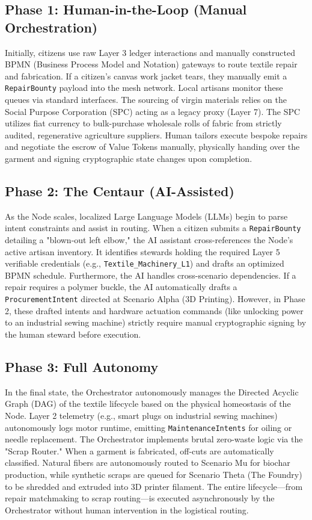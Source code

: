 \subsection{Phase 1: Human-in-the-Loop (Manual Orchestration)}
Initially, citizens use raw Layer 3 ledger interactions and manually constructed BPMN (Business Process Model and Notation) gateways to route textile repair and fabrication. If a citizen's canvas work jacket tears, they manually emit a \texttt{RepairBounty} payload into the mesh network. Local artisans monitor these queues via standard interfaces. 
The sourcing of virgin materials relies on the Social Purpose Corporation (SPC) acting as a legacy proxy (Layer 7). The SPC utilizes fiat currency to bulk-purchase wholesale rolls of fabric from strictly audited, regenerative agriculture suppliers. Human tailors execute bespoke repairs and negotiate the escrow of Value Tokens manually, physically handing over the garment and signing cryptographic state changes upon completion.

\subsection{Phase 2: The Centaur (AI-Assisted)}
As the Node scales, localized Large Language Models (LLMs) begin to parse intent constraints and assist in routing. When a citizen submits a \texttt{RepairBounty} detailing a "blown-out left elbow," the AI assistant cross-references the Node's active artisan inventory. It identifies stewards holding the required Layer 5 verifiable credentials (e.g., \texttt{Textile\_Machinery\_L1}) and drafts an optimized BPMN schedule.
Furthermore, the AI handles cross-scenario dependencies. If a repair requires a polymer buckle, the AI automatically drafts a \texttt{ProcurementIntent} directed at Scenario Alpha (3D Printing). However, in Phase 2, these drafted intents and hardware actuation commands (like unlocking power to an industrial sewing machine) strictly require manual cryptographic signing by the human steward before execution.

\subsection{Phase 3: Full Autonomy}
In the final state, the Orchestrator autonomously manages the Directed Acyclic Graph (DAG) of the textile lifecycle based on the physical homeostasis of the Node. Layer 2 telemetry (e.g., smart plugs on industrial sewing machines) autonomously logs motor runtime, emitting \texttt{MaintenanceIntents} for oiling or needle replacement. 
The Orchestrator implements brutal zero-waste logic via the "Scrap Router." When a garment is fabricated, off-cuts are automatically classified. Natural fibers are autonomously routed to Scenario Mu for biochar production, while synthetic scraps are queued for Scenario Theta (The Foundry) to be shredded and extruded into 3D printer filament. The entire lifecycle---from repair matchmaking to scrap routing---is executed asynchronously by the Orchestrator without human intervention in the logistical routing.

